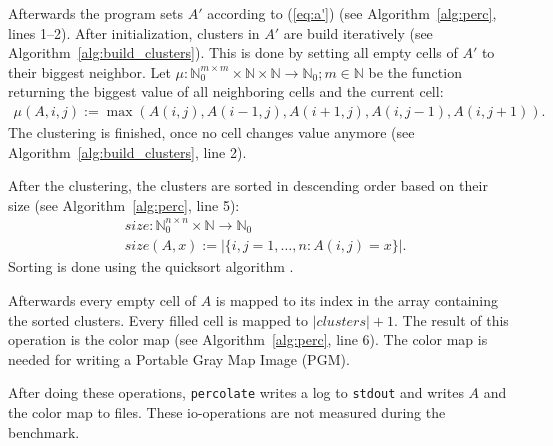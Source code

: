 \documentclass[twoside,11pt]{article}
\def\perc{\texttt{perco\-late}}
\begin{document}
Afterwards the program sets $A'$ according to (\ref{eq:a'})
(see Algorithm~\ref{alg:perc}, lines 1--2).
After initialization, clusters in $A'$ are build
iteratively (see Algorithm~\ref{alg:build_clusters}).
This is done by setting all empty cells of $A'$ to their
biggest neighbor.
Let $\mu:\mathbb{N}_0^{m \times m} \times \mathbb{N} \times
\mathbb{N} \rightarrow \mathbb{N}_0; m \in \mathbb{N}$ be
the function returning the biggest value of all neighboring
cells and the current cell:
\begin{align*}
  \mu(A, i, j) := \max(A(i, j), A(i-1, j), A(i+1, j),
                       A(i, j-1), A(i, j+1)).
\end{align*}
The clustering is finished, once no cell changes value
anymore (see Algorithm~\ref{alg:build_clusters}, line 2).

After the clustering, the clusters are sorted in descending
order based on their size (see Algorithm~\ref{alg:perc},
line 5):
\begin{align*}
&size: \mathbb{N}_0^{n \times n} \times \mathbb{N}
\rightarrow \mathbb{N}_0 \\
&size(A, x) :=
|\{i,j=1,\dots,n: A(i,j) = x\}|.
\end{align*}
Sorting is done using the quicksort algorithm
\citep[see][]{hoare_1961}.

Afterwards every empty cell of $A$ is mapped to its index
in the array containing the sorted clusters.
Every filled cell is mapped to $|clusters| + 1$.
The result of this operation is the color map (see
Algorithm~\ref{alg:perc}, line 6).
The color map is needed for writing a Portable Gray Map
Image (PGM).

After doing these operations, \perc{} writes a log to
\texttt{stdout} and writes $A$ and the color map to files.
These io-operations are not measured during the benchmark.

\begin{algorithm}
  \caption{: \perc{}}
  \label{alg:perc}

  \begin{algorithmic}[1]
  \end{algorithmic}
\end{algorithm}

\begin{algorithm}
  \caption{: build\_clusters($A'$)}
  \label{alg:build_clusters}

  \begin{algorithmic}[1]
      \ENDFOR
    \ENDWHILE
  \end{algorithmic}
\end{algorithm}
\end{document}
